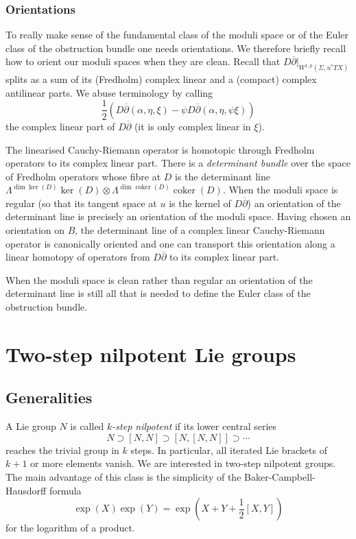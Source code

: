 \documentclass[11pt]{amsart}
\newcommand{\dbar}{\overline{\partial}}
\newcommand{\OP}{\operatorname}
\numberwithin{equation}{section}
\theoremstyle{definition}
\theoremstyle{remark}
\begin{document}
\subsubsection{Orientations}
To really make sense of the fundamental class of the moduli space or of the Euler class of the obstruction bundle one needs orientations. We therefore briefly recall how to orient our moduli spaces when they are clean. Recall that $D\dbar|_{W^{1,p}(\Sigma,u^*TX)}$ splits as a sum of its (Fredholm) complex linear and a (compact) complex antilinear parts. We abuse terminology by calling
\[\frac{1}{2}\left(D\dbar(\alpha,\eta,\xi)-\psi D\dbar(\alpha,\eta,\psi\xi)\right)\]
the complex linear part of $D\dbar$ (it is only complex linear in $\xi$).

The linearised Cauchy-Riemann operator is homotopic through Fredholm operators to its complex linear part. There is a {\em determinant bundle} over the space of Fredholm operators whose fibre at $D$ is the determinant line $\Lambda^{\dim\ker(D)}\ker(D)\otimes\Lambda^{\dim\OP{coker}(D)}\OP{coker}(D)$. When the moduli space is regular (so that its tangent space at $u$ is the kernel of $D\dbar$) an orientation of the determinant line is precisely an orientation of the moduli space. Having chosen an orientation on $B$, the determinant line of a complex linear Cauchy-Riemann operator is canonically oriented and one can transport this orientation along a linear homotopy of operators from $D\dbar$ to its complex linear part.

When the moduli space is clean rather than regular an orientation of the determinant line is still all that is needed to define the Euler class of the obstruction bundle.


\section{Two-step nilpotent Lie groups}\label{nilp}


\subsection{Generalities}

A Lie group $N$ is called \emph{$k$-step nilpotent} if its lower central series
\[N\supset [N,N]\supset [N,[N,N]]\supset\cdots\]
reaches the trivial group in $k$ steps. In particular, all iterated Lie brackets of $k+1$ or more elements vanish. We are interested in two-step nilpotent groups. The main advantage of this class is the simplicity of the Baker-Campbell-Hausdorff formula
\[\exp(X)\exp(Y)=\exp\left(X+Y+\frac{1}{2}[X,Y]\right)\]
for the logarithm of a product.
\end{document}
